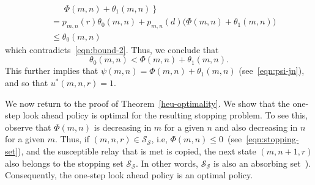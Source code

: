 \documentclass[10pt,journal,letterpaper]{IEEEtran}
\begin{document}
\begin{IEEEproof}
\begin{align*}
& \ \ \ \ \ \  \ \ \left. \Phi(m,n) + \theta_1(m,n)\right\}\\
&~= p_{m,n}(r)\theta_0(m,n) + p_{m,n}(d) \big(\Phi(m,n) + \theta_1(m,n)\big)\\
&~\leq  \theta_0(m,n)
\end{align*}
which contradicts~\eqref{eqn:bound-2}. Thus, we conclude that
\begin{equation*}
\theta_0(m,n) <  \Phi(m,n) + \theta_1(m,n).
\end{equation*}
This further implies that $\psi(m,n) = \Phi(m,n) + \theta_1(m,n)$ (see~\eqref{eqn:psi-jn}),
and so that $u^{\ast}(m,n,r) = 1$.
\end{IEEEproof}

We now return to the proof of Theorem~\ref{heu-optimality}.
We show that the one-step look ahead policy is optimal for the resulting
stopping problem. To see this, observe that $\Phi(m,n)$ is decreasing in $m$ for
a given $n$ and also decreasing in $n$ for a given $m$. Thus,
if $(m,n,r) \in \mathcal{S_S}$, i.e, $\Phi(m,n) \leq 0$~(see~\eqref{eqn:stopping-set}), and the
susceptible relay that is met is copied, the next state $(m,n+1,r)$ also belongs to the
stopping set $\mathcal{S_S}$. In  other words,  $\mathcal{S_S}$ is also an
absorbing set~\cite[Section~3.4]{stochctrl.bertsekas07dpoc-vol2}).
Consequently, the one-step look ahead policy is an optimal policy.
\end{document}
